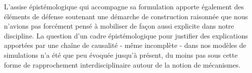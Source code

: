 L'assise épistémologique qui accompagne sa formulation apporte également des éléments de défense soutenant une démarche de construction raisonnée que nous n'avions pas forcément pensé à mobiliser de façon aussi explicite dans notre discipline. La question d'un cadre épistémologique pour justifier des explications apportées par une chaîne de causalité - même incomplète - dans nos modèles de simulations n'a été que peu évoquée jusqu'à présent, du moins pas sous cette forme de rapprochement interdisciplinaire autour de la notion de mécanismes.
